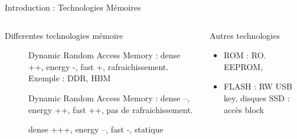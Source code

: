 \begin{Frame}{Introduction : Technologies Mémoires}
 \begin{columns}[t]
  \begin{column}{\BW}
    \begin{block}{Differentes technologies mémoire}
      
      \begin{description}
      \item[] Dynamic Random Access Memory : dense ++, 
        energy -, fast +, rafraichissement. Exemple : DDR, HBM
      \item[] Dynamic Random Access Memory :  dense --,
        energy ++, fast ++, pas de rafraichissement.
      \item[] dense +++, energy --, fast -, statique
      \end{description}
    \end{block}
  \end{column}
  \begin{column}{\BW}
    \begin{block}{Autres technologies }
      \begin{itemize}
      \item ROM : RO. EEPROM, 
      \item FLASH : RW    USB key, disques SSD : accès block
      \end{itemize}
    \end{block}
  \end{column}

 \end{columns}
\end{Frame}
